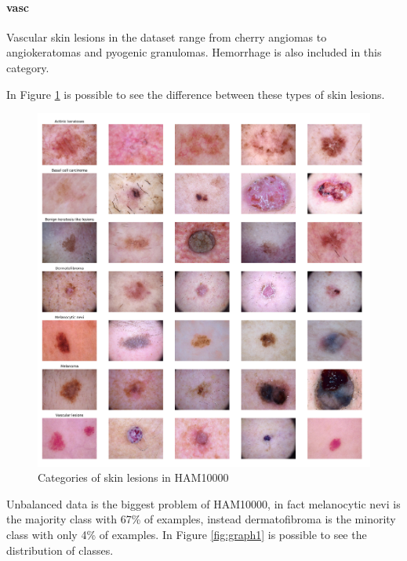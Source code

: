 	\paragraph{vasc}
	Vascular skin lesions in the dataset range from cherry angiomas to angiokeratomas and pyogenic granulomas. Hemorrhage is also included in this category.
	
	\bigskip
	
	In Figure \ref{fig:category_samples} is possible to see the difference between these types of skin lesions.
	
	\begin{figure}[H]
		\centering
		\includegraphics[width=15cm]{images/category_samples.png}
		\caption{Categories of skin lesions in HAM10000}
		\label{fig:category_samples}
	\end{figure}
	
	Unbalanced data is the biggest problem of HAM10000, in fact melanocytic nevi is the majority class with 67\% of examples, instead dermatofibroma is the minority class with only 4\% of examples. In Figure \ref{fig:graph1} is possible to see the distribution of classes. 
	
	\smallskip
	
